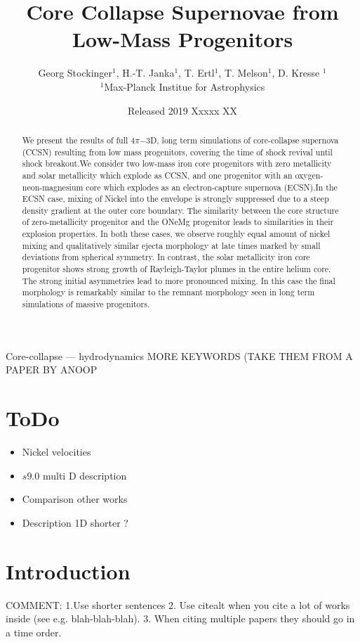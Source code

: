 \documentclass[fleqn,usenatbib]{mnras}
\title{Core Collapse Supernovae from Low-Mass Progenitors}
\author[G. Stockinger et. al]{Georg Stockinger$^1$, H.-T. Janka$^1$, T. Ertl$^1$, T. Melson$^1$, D. Kresse $^1$\\
$^1$Max-Planck Institue for Astrophysics}
\date{Released 2019 Xxxxx XX}
\newcommand{\NY}[2]{{\color{blue}\sout{#1}#2}}
\begin{document}
\maketitle
\pagerange{\pageref{firstpage}--\pageref{lastpage}} 

\begin{abstract}
We present the results of full $4\pi\mathord{-}$3D, long term simulations of core-collapse supernova (CCSN) resulting from low mass progenitors, covering the time of shock revival until shock breakout.We consider two low-mass iron core progenitors with zero metallicity and solar metallicity which explode as CCSN, and one progenitor with an oxygen-neon-magnesium core which explodes as an electron-capture supernova (ECSN).In the ECSN case, mixing of Nickel into the envelope is strongly suppressed due to a steep density gradient at the outer core boundary. The similarity between the core structure of zero-metallicity progenitor and the ONeMg progenitor leads to similarities in their explosion properties. In both these cases, we observe roughly equal amount of nickel mixing and qualitatively similar ejecta morphology at late times marked by small deviations from spherical symmetry. In contrast, the solar metallicity iron core progenitor shows strong growth of Rayleigh-Taylor plumes in the entire helium core. The strong initial asymmetries lead to more pronounced mixing. In this case the final morphology is remarkably similar to the remnant morphology seen in long term simulations of massive progenitors. 


\end{abstract}

\begin{keywords}
Core-collapse --- hydrodynamics
\NY{}{MORE KEYWORDS (TAKE THEM FROM A PAPER BY ANOOP}
\end{keywords}
\noindent

\section{ToDo}
\begin{itemize}
    \item Nickel velocities
    \item $s9.0$ multi D description
    \item Comparison other works
    \item Description 1D shorter ?
\end{itemize}

\section{Introduction}
\NY{}{COMMENT: 1.Use shorter sentences 2. Use citealt when you cite a lot of works inside (see e.g. blah-blah-blah). 3. When citing multiple papers they should go in a time order.}
\end{document}
